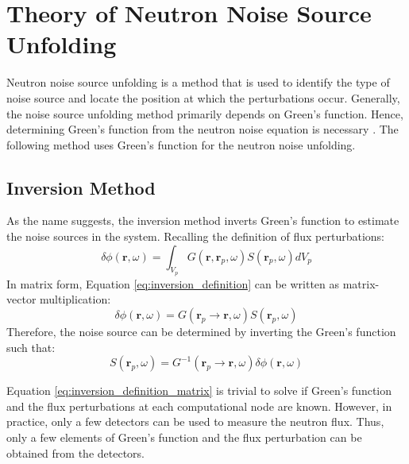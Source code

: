 \label{ch:existing_methods}

\section{Theory of Neutron Noise Source Unfolding}
\label{sec:unfolding_theory}
Neutron noise source unfolding is a method that is used to identify the type of noise source and locate the position at which the perturbations occur. Generally, the noise source unfolding method primarily depends on Green’s function. Hence, determining Green’s function from the neutron noise equation is necessary \cite{demaziereIdentificationLocalizationAbsorbers2005}. The following method uses Green’s function for the neutron noise unfolding.

\subsection{Inversion Method}

As the name suggests, the inversion method inverts Green’s function to estimate the noise sources in the system. Recalling the definition of flux perturbations:
\begin{equation}
    \delta \phi (\textbf{r},\omega) = \int_{V_p} G(\textbf{r}, \textbf{r}_p, \omega) S(\textbf{r}_p, \omega) dV_p
    \label{eq:inversion_definition}
\end{equation}
In matrix form, Equation \ref{eq:inversion_definition} can be written as matrix-vector multiplication:
\begin{equation}
    \delta \phi (\textbf{r},\omega) = G(\textbf{r}_p \rightarrow \textbf{r}, \omega) S(\textbf{r}_p, \omega)
    \label{eq:inversion_definition_matrix}
\end{equation}
Therefore, the noise source can be determined by inverting the Green’s function such that:
\begin{equation}
    S(\textbf{r}_p, \omega) = G^{-1}(\textbf{r}_p \rightarrow \textbf{r}, \omega) \delta \phi (\textbf{r},\omega) 
    \label{eq:source_inversion_matrix}
\end{equation}

Equation \ref{eq:inversion_definition_matrix} is trivial to solve if Green’s function and the flux perturbations at each computational node are known. However, in practice, only a few detectors can be used to measure the neutron flux. Thus, only a few elements of Green’s function and the flux perturbation can be obtained from the detectors. 

